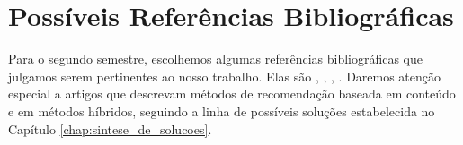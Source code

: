 \chapter{Possíveis Referências Bibliográficas} %
\label{cha:poss_veis_refer_ncias_bibliogr_ficas}

Para o segundo semestre, escolhemos algumas referências bibliográficas que julgamos serem pertinentes ao nosso trabalho. Elas são \cite{hansen2009mixing}, \cite{shani2011evaluating}, \cite{de2010combining}, \cite{guo2010improved}. Daremos atenção especial a artigos que descrevam métodos de recomendação baseada em conteúdo e em métodos híbridos, seguindo a linha de possíveis soluções estabelecida no Capítulo \ref{chap:sintese_de_solucoes}.